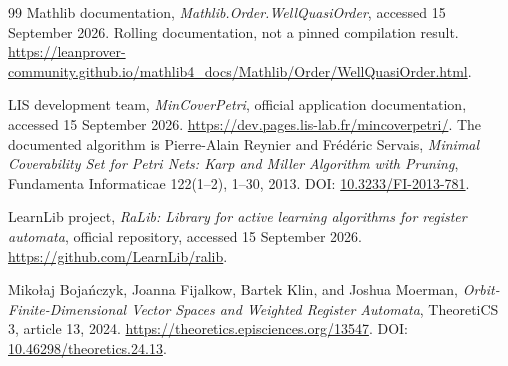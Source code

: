 \begin{thebibliography}{99}
Mathlib documentation, \emph{Mathlib.Order.WellQuasiOrder}, accessed
15 September 2026. Rolling documentation, not a pinned compilation result.
\url{https://leanprover-community.github.io/mathlib4_docs/Mathlib/Order/WellQuasiOrder.html}.

LIS development team, \emph{MinCoverPetri}, official application documentation,
accessed 15 September 2026.
\url{https://dev.pages.lis-lab.fr/mincoverpetri/}.
The documented algorithm is Pierre-Alain Reynier and Fr\'ed\'eric Servais,
\emph{Minimal Coverability Set for Petri Nets: Karp and Miller Algorithm with
Pruning}, Fundamenta Informaticae 122(1--2), 1--30, 2013.
DOI: \href{https://doi.org/10.3233/FI-2013-781}{10.3233/FI-2013-781}.

LearnLib project, \emph{RaLib: Library for active learning algorithms for register
automata}, official repository, accessed 15 September 2026.
\url{https://github.com/LearnLib/ralib}.

Miko\l{}aj Boja\'nczyk, Joanna Fijalkow, Bartek Klin, and Joshua Moerman,
\emph{Orbit-Finite-Dimensional Vector Spaces and Weighted Register Automata},
TheoretiCS 3, article 13, 2024.
\url{https://theoretics.episciences.org/13547}.
DOI: \href{https://doi.org/10.46298/theoretics.24.13}{10.46298/theoretics.24.13}.
\end{thebibliography}
